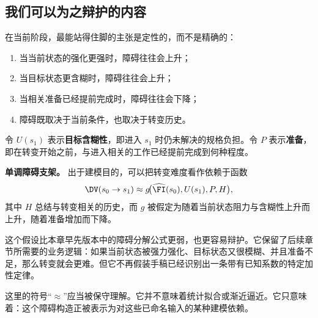 \subsection{我们可以为之辩护的内容}

在当前阶段，最能站得住脚的主张是定性的，而不是精确的：
\begin{enumerate}[nosep]
  \item 当当前状态的强化更强时，障碍往往会上升；
  \item 当目标状态更含糊时，障碍往往会上升；
  \item 当相关准备已经提前完成时，障碍往往会下降；
  \item 障碍既取决于当前条件，也取决于转变历史。
\end{enumerate}

\begin{definition}[准备与含糊性]
令 $U(s_1)$ 表示\textbf{目标含糊性}，即进入 $s_1$ 时仍未解决的规格负担。令 $P$ 表示\textbf{准备}，即在转变开始之前，与进入相关的工作已经提前完成到何种程度。
\end{definition}

\begin{remark}
\textbf{单调障碍支架。}
出于建模目的，可以把转变难度看作依赖于函数
\[
  \DV(s_0 \to s_1) \approx g\!\bigl(\widehat{\FI}(s_0), U(s_1), P, H\bigr),
\]
其中 $H$ 总结与转变相关的历史，而 $g$ 被假定为随着当前状态阻力与含糊性上升而上升，随着准备增加而下降。
\end{remark}

\begin{discussion}
这个假设比本章早先版本中的障碍分解公式更弱，也更容易辩护。它保留了后续章节所需要的业务逻辑：如果当前状态被强力强化、目标状态又很模糊、并且准备不足，那么转变就会更难。但它不再假装手稿已经识别出一条带有已知系数的特定加性定律。
\end{discussion}

\begin{remark}
这里的符号“$\approx$”应当被保守理解。它并不意味着统计拟合或渐近逼近。它只意味着：这个障碍构造正被表示为对这些已命名输入的某种建模依赖。
\end{remark}